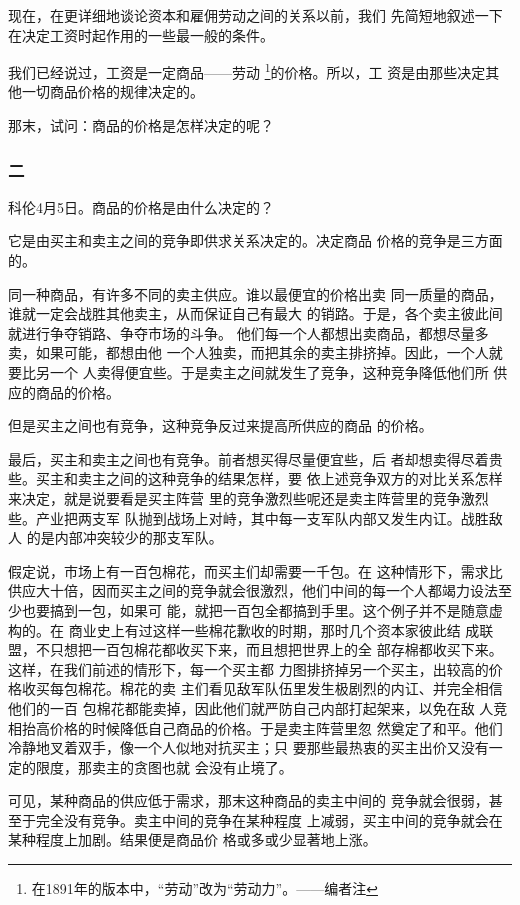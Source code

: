 \documentclass[a4paper,twoside,12pt,AutoFakeBold]{ctexart}
\begin{document}
现在，在更详细地谈论资本和雇佣劳动之间的关系以前，我们
先简短地叙述一下在决定工资时起作用的一些最一般的条件。

我们已经说过，工资是一定商品——劳动 \footnote{在1891年的版本中，“劳动”改为“劳动力”。——编者注}的价格。所以，工
资是由那些决定其他一切商品价格的规律决定的。

那末，试问：商品的价格是怎样决定的呢？

\subsubsection{二}
科伦4月5日。商品的价格是由什么决定的？

它是由买主和卖主之间的竞争即供求关系决定的。决定商品
价格的竞争是三方面的。

同一种商品，有许多不同的卖主供应。谁以最便宜的价格出卖
同一质量的商品，谁就一定会战胜其他卖主，从而保证自己有最大
的销路。于是，各个卖主彼此间就进行争夺销路、争夺市场的斗争。
他们每一个人都想出卖商品，都想尽量多卖，如果可能，都想由他
一个人独卖，而把其余的卖主排挤掉。因此，一个人就要比另一个
人卖得便宜些。于是卖主之间就发生了竞争，这种竞争降低他们所
供应的商品的价格。

但是买主之间也有竞争，这种竞争反过来提高所供应的商品
的价格。

最后，买主和卖主之间也有竞争。前者想买得尽量便宜些，后
者却想卖得尽着贵些。买主和卖主之间的这种竞争的结果怎样，要
依上述竞争双方的对比关系怎样来决定，就是说要看是买主阵营
里的竞争激烈些呢还是卖主阵营里的竞争激烈些。产业把两支军
队抛到战场上对峙，其中每一支军队内部又发生内讧。战胜敌人
的是内部冲突较少的那支军队。

假定说，市场上有一百包棉花，而买主们却需要一千包。在
这种情形下，需求比供应大十倍，因而买主之间的竞争就会很激烈，他们中间的每一个人都竭力设法至少也要搞到一包，如果可
能，就把一百包全都搞到手里。这个例子并不是随意虚构的。在
商业史上有过这样一些棉花歉收的时期，那时几个资本家彼此结
成联盟，不只想把一百包棉花都收买下来，而且想把世界上的全
部存棉都收买下来。这样，在我们前述的情形下，每一个买主都
力图排挤掉另一个买主，出较高的价格收买每包棉花。棉花的卖
主们看见敌军队伍里发生极剧烈的内讧、并完全相信他们的一百
包棉花都能卖掉，因此他们就严防自己内部打起架来，以免在敌
人竞相抬高价格的时候降低自己商品的价格。于是卖主阵营里忽
然奠定了和平。他们冷静地叉着双手，像一个人似地对抗买主；只
要那些最热衷的买主出价又没有一定的限度，那卖主的贪图也就
会没有止境了。

可见，某种商品的供应低于需求，那末这种商品的卖主中间的
竞争就会很弱，甚至于完全没有竞争。卖主中间的竞争在某种程度
上减弱，买主中间的竞争就会在某种程度上加剧。结果便是商品价
格或多或少显著地上涨。
\end{document}
